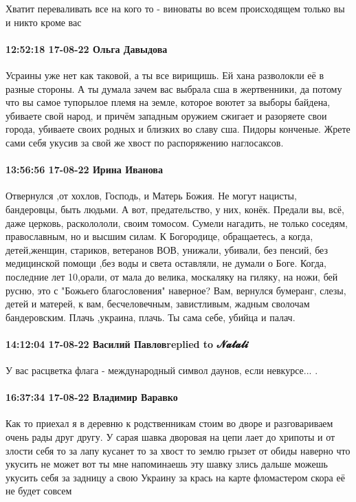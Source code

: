 Хватит переваливать все на кого то - виноваты во всем происходящем только вы и
никто кроме вас


\paragraph{12:52:18 17-08-22 Ольга Давыдова}

Усраины уже нет как таковой, а ты все вирищишь. Ей хана разволокли её в разные
стороны. А ты думала зачем вас выбрала сша в жертвенники, да потому что вы
самое тупорылое племя на земле, которое воютет за выборы байдена, убиваете свой
народ, и причём западным оружием сжигает и разоряете свои города, убиваете
своих родных и близких во славу сша. Пидоры конченые. Жрете сами себя укусив за
свой же хвост по распоряжению наглосаксов.

\paragraph{13:56:56 17-08-22 Ирина Иванова}

Отвернулся ,от хохлов, Господь, и Матерь Божия. Не могут нацисты, бандеровцы,
быть людьми. А вот, предательство, у них, конёк. Предали вы, всё, даже церковь,
расколололи, своим томосом. Сумели нагадить, не только соседям, православным,
но и высшим силам. К Богородице, обращаетесь, а когда, детей,женщин, стариков,
ветеранов ВОВ, унижали, убивали, без пенсий, без медицинской помощи ,без воды и
света оставляли, не думали о Боге. Когда, последние лет 10,орали, от мала до
велика, москаляку на гиляку, на ножи, бей русню, это с "Божьего благословения"
наверное? Вам, вернулся бумеранг, слезы, детей и матерей, к вам, бесчеловечным,
завистливым, жадным сволочам бандеровским. Плачь ,украина, плачь. Ты сама себе,
убийца и палач.

\paragraph{14:12:04 17-08-22 Василий Павловreplied to 𝓝𝓪𝓽𝓪𝓵𝓲}

У вас расцветка флага - международный символ даунов, если невкурсе... .

\paragraph{16:37:34 17-08-22 Владимир Варавко}

Как то приехал я в деревню к родственникам стоим во дворе и разговариваем очень
рады друг другу. У сарая шавка дворовая на цепи лает до хрипоты и от злости
себя то за лапу кусанет то за хвост то землю грызет от обиды наверно что
укусить не может вот ты мне напоминаешь эту шавку злись дальше можешь укусить
себя за задницу а свою Украину за крась на карте фломастером скора её не будет
совсем


